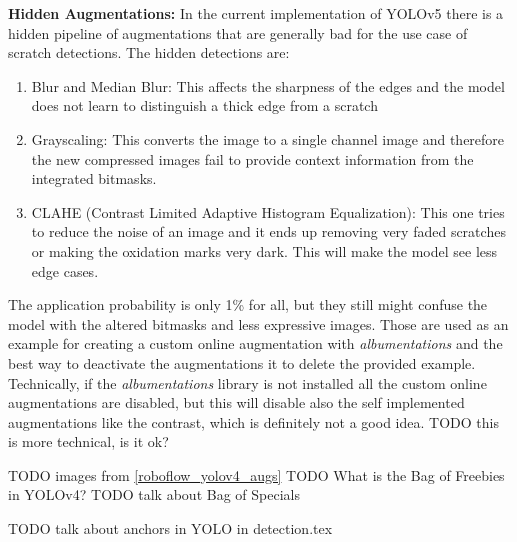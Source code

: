 \textbf{Hidden Augmentations:}
In the current implementation of YOLOv5 there is a hidden pipeline of augmentations that are generally bad for the use case of scratch detections. The hidden detections are:
\begin{enumerate}
\item Blur and Median Blur: This affects the sharpness of the edges and the model does not learn to distinguish a thick edge from a scratch
\item Grayscaling: This converts the image to a single channel image and therefore the new compressed images fail to provide context information from the integrated bitmasks.
\item CLAHE (Contrast Limited Adaptive Histogram Equalization): This one tries to reduce the noise of an image and it ends up removing very faded scratches or making the oxidation marks very dark. This will make the model see less edge cases. \\
\end{enumerate}
The application probability is only 1\% for all, but they still might confuse the model with the altered bitmasks and less expressive images. Those are used as an example for creating a custom online augmentation with \textit{albumentations} and the best way to deactivate the augmentations it to delete the provided example. Technically, if the \textit{albumentations} library is not installed all the custom online augmentations are disabled, but this will disable also the self implemented augmentations like the contrast, which is definitely not a good idea.
TODO this is more technical, is it ok?

TODO images from \ref{roboflow_yolov4_augs}
TODO What is the Bag of Freebies in YOLOv4?
TODO talk about Bag of Specials

TODO talk about anchors in YOLO in detection.tex


